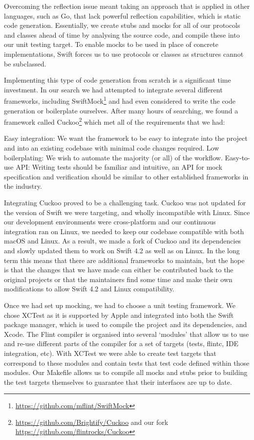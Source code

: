 Overcoming the reflection issue meant taking an approach that is applied in other languages, such as Go, that lack powerful reflection capabilities, which is static code generation. Essentially, we create stubs and mocks for all of our protocols and classes ahead of time by analysing the source code, and compile these into our unit testing target. To enable mocks to be used in place of concrete implementations, Swift forces us to use protocols or classes as structures cannot be subclassed.

Implementing this type of code generation from scratch is a significant time investment. In our search we had attempted to integrate several different frameworks, including SwiftMock\footnote{\url{https://github.com/mflint/SwiftMock}} and had even considered to write the code generation or boilerplate ourselves. After many hours of searching, we found a framework called Cuckoo\footnote{\url{https://github.com/Brightify/Cuckoo} and our fork \url{https://github.com/flintrocks/Cuckoo}} which met all of the requirements that we had:

Easy integration: We want the framework to be easy to integrate into the project and into an existing codebase with minimal code changes required.
Low boilerplating: We wish to automate the majority (or all) of the workflow.
Easy-to-use API: Writing tests should be familiar and intuitive, an API for mock specification and verification should be similar to other established frameworks in the industry.

Integrating Cuckoo proved to be a challenging task. Cuckoo was not updated for the version of Swift we were targeting, and wholly incompatible with Linux. Since our development environments were cross-platform and our continuous integration ran on Linux, we needed to keep our codebase compatible with both macOS and Linux. As a result, we made a fork of Cuckoo and its dependencies and slowly updated them to work on Swift 4.2 as well as on Linux. In the long term this means that there are additional frameworks to maintain, but the hope is that the changes that we have made can either be contributed back to the original projects or that the maintainers find some time and make their own modifications to allow Swift 4.2 and Linux compatibility.

Once we had set up mocking, we had to choose a unit testing framework. We chose XCTest as it is supported by Apple and integrated into both the Swift package manager, which is used to compile the project and its dependencies, and Xcode. The Flint compiler is organised into several `modules' that allow us to use and re-use different parts of the compiler for a set of targets (tests, flintc, IDE integration, etc). With XCTest we were able to create test targets that correspond to these modules and contain tests that test code defined within those modules. Our Makefile allows us to compile all mocks and stubs prior to building the test targets themselves to guarantee that their interfaces are up to date.

